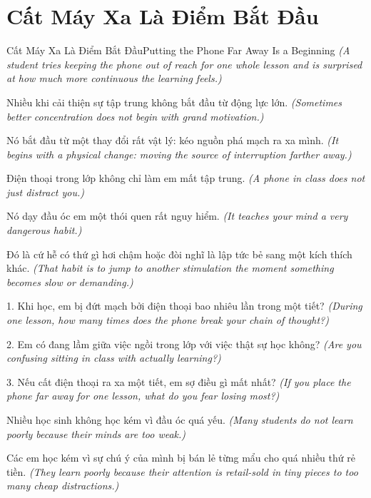 \section{Cất Máy Xa Là Điểm Bắt Đầu}
\begin{truyen}{Cất Máy Xa Là Điểm Bắt Đầu}{Putting the Phone Far Away Is a Beginning}
\textit{(A student tries keeping the phone out of reach for one whole lesson and is surprised at how much more continuous the learning feels.)}

Nhiều khi cải thiện sự tập trung không bắt đầu từ động lực lớn.
\textit{(Sometimes better concentration does not begin with grand motivation.)}

Nó bắt đầu từ một thay đổi rất vật lý: kéo nguồn phá mạch ra xa mình.
\textit{(It begins with a physical change: moving the source of interruption farther away.)}

\end{truyen}

\begin{baihoc}
Điện thoại trong lớp không chỉ làm em mất tập trung.
\textit{(A phone in class does not just distract you.)}

Nó dạy đầu óc em một thói quen rất nguy hiểm.
\textit{(It teaches your mind a very dangerous habit.)}

Đó là cứ hễ có thứ gì hơi chậm hoặc đòi nghĩ là lập tức bẻ sang một kích thích khác.
\textit{(That habit is to jump to another stimulation the moment something becomes slow or demanding.)}
\end{baihoc}

\begin{tuhocnhanh}
1. Khi học, em bị đứt mạch bởi điện thoại bao nhiêu lần trong một tiết? \textit{(During one lesson, how many times does the phone break your chain of thought?)}

2. Em có đang lầm giữa việc ngồi trong lớp với việc thật sự học không? \textit{(Are you confusing sitting in class with actually learning?)}

3. Nếu cất điện thoại ra xa một tiết, em sợ điều gì mất nhất? \textit{(If you place the phone far away for one lesson, what do you fear losing most?)}
\end{tuhocnhanh}

\begin{tongketchuong}
Nhiều học sinh không học kém vì đầu óc quá yếu.
\textit{(Many students do not learn poorly because their minds are too weak.)}

Các em học kém vì sự chú ý của mình bị bán lẻ từng mẩu cho quá nhiều thứ rẻ tiền.
\textit{(They learn poorly because their attention is retail-sold in tiny pieces to too many cheap distractions.)}
\end{tongketchuong}

\ngancach